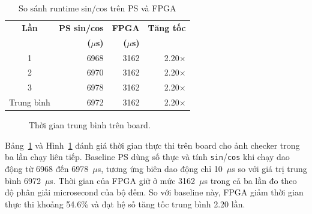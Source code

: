 ﻿\documentclass[conference]{IEEEtran}
\begin{document}
\begin{table}[H]
    \caption{So sánh runtime sin/cos trên PS và FPGA}
    \centering
    \label{tab:board_runtime_sincos}
    \begin{tabular}{crrr}
        \toprule
        \textbf{Lần} & \textbf{PS sin/cos} & \textbf{FPGA} & \textbf{Tăng tốc} \\
                     & \textbf{($\mu$s)}   & \textbf{($\mu$s)} &                  \\
        \midrule
        1            & 6968                & 3162          & 2.20$\times$      \\
        2            & 6970                & 3162          & 2.20$\times$      \\
        3            & 6978                & 3162          & 2.20$\times$      \\
        \midrule
        Trung bình   & 6972                & 3162          & 2.20$\times$      \\
        \bottomrule
    \end{tabular}
\end{table}

\begin{figure}[H]
    \centering
    \caption{Thời gian trung bình trên board.}
    \label{fig:board_runtime_sincos_chart}
\end{figure}

Bảng~\ref{tab:board_runtime_sincos} và Hình~\ref{fig:board_runtime_sincos_chart} đánh giá thời gian thực thi trên board cho ảnh checker trong ba lần chạy liên tiếp. Baseline PS dùng số thực và tính \texttt{sin}/\texttt{cos} khi chạy dao động từ 6968 đến 6978~$\mu$s, tương ứng biên dao động chỉ 10~$\mu$s so với giá trị trung bình 6972~$\mu$s. Thời gian của FPGA giữ ở mức 3162~$\mu$s trong cả ba lần đo theo độ phân giải microsecond của bộ đếm. So với baseline này, FPGA giảm thời gian thực thi khoảng 54.6\% và đạt hệ số tăng tốc trung bình 2.20 lần.
\end{document}
